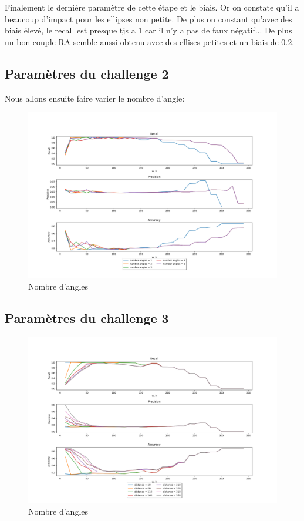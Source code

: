 \documentclass[a4paper,12pt, openany]{book}
\theoremstyle{break}
\begin{document}
Finalement le dernière paramètre de cette étape et le biais. Or on constate qu'il a beaucoup d'impact pour les ellipses non petite. De plus on constant qu'avec des biais élevé, le recall est presque tjs a 1 car il n'y a pas de faux négatif... De plus un bon couple RA semble aussi obtenu avec des ellises petites et un biais de $0.2$.

\subsection{Paramètres du challenge 2}
Nous allons ensuite faire varier le nombre d'angle:

\begin{figure}[H]
  \includegraphics[width=\textwidth]{images/compare_angle}
  \caption{Nombre d'angles}
  \label{fig:angles}
\end{figure}


\subsection{Paramètres du challenge 3}

\begin{figure}[H]
  \includegraphics[width=\textwidth]{images/compare_distance}
  \caption{Nombre d'angles}
  \label{fig:dist}
\end{figure}
\end{document}

